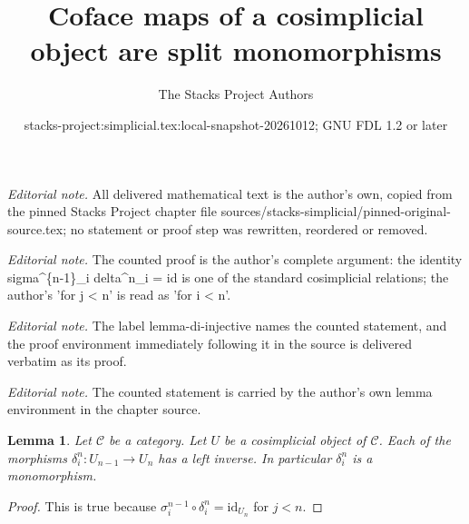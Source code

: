 \documentclass{stacks-project}
\title{Coface maps of a cosimplicial object are split monomorphisms}
\author{The Stacks Project Authors}
\date{stacks-project:simplicial.tex:local-snapshot-20261012; GNU FDL 1.2 or later}
\theoremstyle{plain}
\newtheorem{lemma}[subsection]{Lemma}
\theoremstyle{definition}
\theoremstyle{remark}
\numberwithin{equation}{subsection}
\begin{document}
\maketitle
\noindent\textit{Editorial note.} All delivered mathematical text is the author's own, copied from the pinned Stacks Project chapter file sources/stacks-simplicial/pinned-original-source.tex; no statement or proof step was rewritten, reordered or removed.\par\medskip
\noindent\textit{Editorial note.} The counted proof is the author's complete argument: the identity sigma\textasciicircum{}\{n-1\}\_i delta\textasciicircum{}n\_i = id is one of the standard cosimplicial relations; the author's 'for j < n' is read as 'for i < n'.\par\medskip
\noindent\textit{Editorial note.} The label lemma-di-injective names the counted statement, and the proof environment immediately following it in the source is delivered verbatim as its proof.\par\medskip
\noindent\textit{Editorial note.} The counted statement is carried by the author's own lemma environment in the chapter source.\par\medskip
\begin{lemma}
\label{lemma-di-injective}
Let $\mathcal{C}$ be a category.
Let $U$ be a cosimplicial object of $\mathcal{C}$.
Each of the morphisms $\delta^n_i : U_{n - 1} \to U_n$
has a left inverse. In particular $\delta^n_i$ is a monomorphism.
\end{lemma}

\begin{proof}
This is true because
$\sigma_i^{n - 1} \circ \delta^n_i = \text{id}_{U_n}$
for $j < n$.
\end{proof}
\end{document}
